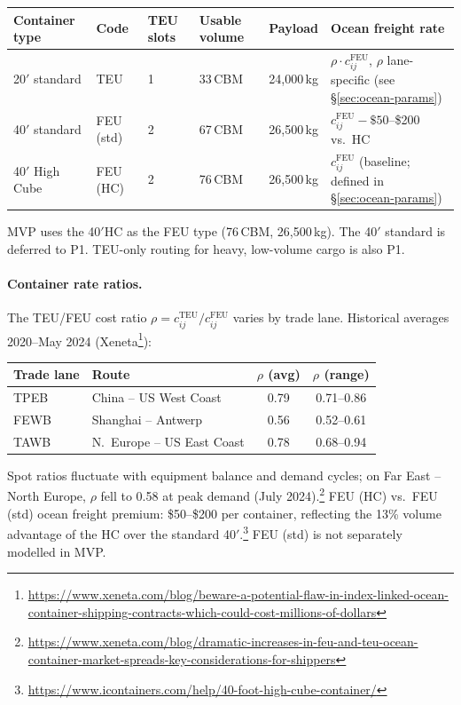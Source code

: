 \documentclass[11pt,a4paper]{article}
\theoremstyle{definition}
\begin{document}
\begin{center}
\begin{tabular}{llllll}
\toprule
Container type & Code & TEU slots & Usable volume & Payload & Ocean freight rate \\
\midrule
20$'$ standard & TEU & 1 & 33\,CBM & 24{,}000\,kg & $\rho \cdot c_{ij}^{\text{FEU}}$, $\rho$ lane-specific (see \S\ref{sec:ocean-params}) \\
40$'$ standard & FEU (std) & 2 & 67\,CBM & 26{,}500\,kg & $c_{ij}^{\text{FEU}} - \$50$--\$200 vs.\ HC \\
40$'$ High Cube & FEU (HC) & 2 & 76\,CBM & 26{,}500\,kg & $c_{ij}^{\text{FEU}}$ (baseline; defined in \S\ref{sec:ocean-params}) \\
\bottomrule
\end{tabular}
\end{center}

\noindent MVP uses the 40$'$HC as the FEU type (76\,CBM, 26{,}500\,kg). The 40$'$ standard
is deferred to P1. TEU-only routing for heavy, low-volume cargo is also P1.

\paragraph{Container rate ratios.}
The TEU/FEU cost ratio $\rho = c_{ij}^{\text{TEU}} / c_{ij}^{\text{FEU}}$ varies by trade lane.
Historical averages 2020--May 2024 (Xeneta\footnote{\url{https://www.xeneta.com/blog/beware-a-potential-flaw-in-index-linked-ocean-container-shipping-contracts-which-could-cost-millions-of-dollars}}):

\begin{center}
\begin{tabular}{llcc}
\toprule
Trade lane & Route & $\rho$ (avg) & $\rho$ (range) \\
\midrule
TPEB & China -- US West Coast & 0.79 & 0.71--0.86 \\
FEWB & Shanghai -- Antwerp    & 0.56 & 0.52--0.61 \\
TAWB & N.\ Europe -- US East Coast & 0.78 & 0.68--0.94 \\
\bottomrule
\end{tabular}
\end{center}
\noindent Spot ratios fluctuate with equipment balance and demand cycles; on Far East -- North
Europe, $\rho$ fell to 0.58 at peak demand (July 2024).\footnote{\url{https://www.xeneta.com/blog/dramatic-increases-in-feu-and-teu-ocean-container-market-spreads-key-considerations-for-shippers}}
FEU (HC) vs.\ FEU (std) ocean freight premium: \$50--\$200 per container, reflecting the 13\%
volume advantage of the HC over the standard 40$'$.\footnote{\url{https://www.icontainers.com/help/40-foot-high-cube-container/}}
FEU (std) is not separately modelled in MVP.
\end{document}
